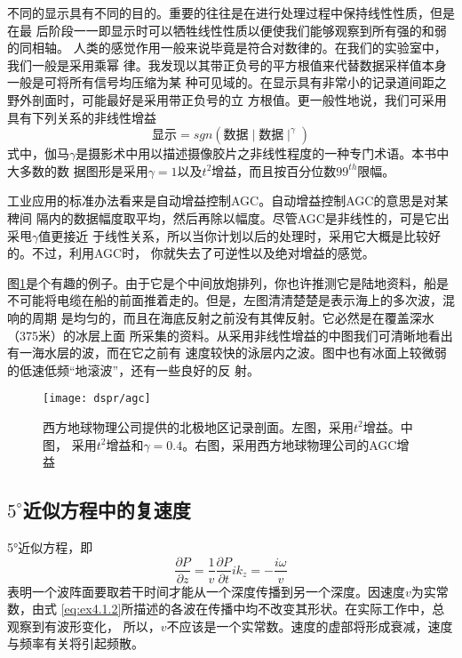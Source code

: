 不同的显示具有不同的目的。重要的往往是在进行处理过程中保持线性性质，但是在最
后阶段一一即显示时可以牺牲线性性质以便使我们能够观察到所有强的和弱的同相轴。
人类的感觉作用一般来说毕竟是符合对数律的。在我们的实验室中，我们一般是采用乘幂
律。我发现以其带正负号的平方根值来代替数据采样值本身一般是可将所有信号均压缩为某
种可见域的。在显示具有非常小的记录道间距之野外剖面时，可能最好是采用带正负号的立
方根值。更一般性地说，我们可采用具有下列关系的非线性增益
\begin{equation}
\text{显示}=sgn(\text{数据}\mid\text{数据}\mid^{\gamma})
\label{eq:ex4.1.1}
\end{equation}
式中，伽马$\gamma$是摄影术中用以描述摄像胶片之非线性程度的一种专门术语。本书中大多数的数
据图形是采用$\gamma=1$以及$t^2$增益，而且按百分位数$99^{th}$限幅。

工业应用的标准办法看来是自动增益控制AGC。自动增益控制AGC的意思是对某稗间
隔内的数据幅度取平均，然后再除以幅度。尽管AGC是非线性的，可是它出采甩$\gamma$值更接近
于线性关系，所以当你计划以后的处理时，采用它大概是比较好的。不过，利用AGC时，
你就失去了可逆性以及绝对增益的感觉。

图\ref{fig:dspr/agc}是个有趣的例子。由于它是个中间放炮排列，你也许推测它是陆地资料，船是
不可能将电缆在船的前面推着走的。但是，左图清清楚楚是表示海上的多次波，混响的周期
是均匀的，而且在海底反射之前没有其俾反射。它必然是在覆盖深水（375米）的冰层上面
所采集的资料。从采用非线性增益的中图我们可清晰地看出有一海水层的波，而在它之前有
速度较快的泳层内之波。图中也有冰面上较微弱的低速低频“地滚波”，还有一些良好的反
射。

\begin{figure}[H]
\centering
\texttt{[image: dspr/agc]}
\caption[agc]{西方地球物理公司提供的北极地区记录剖面。左图，采用$t^2$增益。中图，
采用$t^2$增益和$\gamma=0.4$。右图，采用西方地球物理公司的AGC增益}
\label{fig:dspr/agc}
\end{figure}


\subsection{$5^{\circ}$近似方程中的复速度}
\label{sec:4.1.3}

5°近似方程，即
\begin{subequations}
\begin{equation}
\frac{\partial P}{\partial z}=\frac{1}{v}\frac{\partial P}{\partial t}
\label{eq:ex4.1.2a}
\end{equation}
\begin{equation}
ik_z=-\frac{i\omega}{v}
\label{eq:ex4.1.2b}
\end{equation}
\label{eq:ex4.1.2}
\end{subequations}
表明一个波阵面要取若干时间才能从一个深度传播到另一个深度。因速度$v$为实常数，由式
\ref{eq:ex4.1.2}所描述的各波在传播中均不改变其形状。在实际工作中，总观察到有波形变化，
所以，$v$不应该是一个实常数。速度的虚部将形成衰减，速度与频率有关将引起频散。

